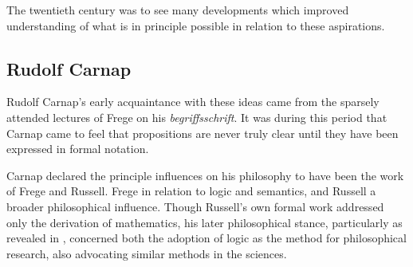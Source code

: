 The twentieth century was to see many developments which improved understanding of what is in principle possible in relation to these aspirations.

\subsection{Rudolf Carnap}

Rudolf Carnap's early acquaintance with these ideas came from the sparsely attended lectures of Frege on his \emph{begriffsschrift}.
It was during this period that Carnap came to feel that propositions are never truly clear until they have been expressed in formal notation.

Carnap declared the principle influences on his philosophy to have been the work of Frege and Russell.
Frege in relation to logic and semantics, and Russell a broader philosophical influence.
Though Russell's own formal work addressed only the derivation of mathematics, his later philosophical stance, particularly as revealed in \cite{russell21}, concerned both the adoption of logic as the method for philosophical research, also advocating similar methods in the sciences.




